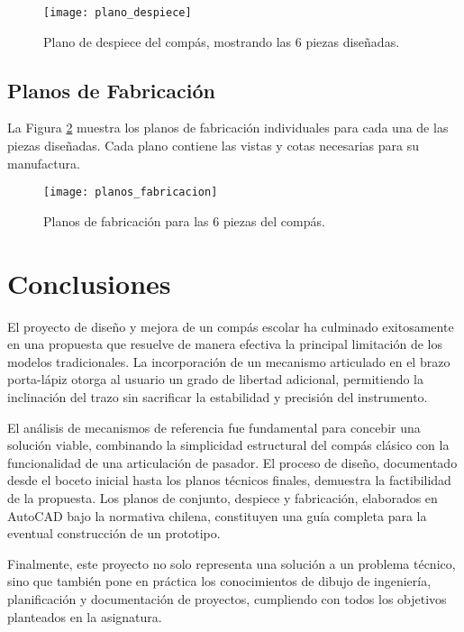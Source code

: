 \documentclass[11pt, a4paper]{article}
\begin{document}
\begin{figure}[H]
    \centering
    \texttt{[image: plano\_despiece]}
    \caption{Plano de despiece del compás, mostrando las 6 piezas diseñadas.}
    \label{fig:despiece}
\end{figure}
\newpage

\subsection{Planos de Fabricación}
La Figura \ref{fig:fabricacion} muestra los planos de fabricación individuales para cada una de las piezas diseñadas. Cada plano contiene las vistas y cotas necesarias para su manufactura.

\begin{figure}[H]
    \centering
    \texttt{[image: planos\_fabricacion]}
    \caption{Planos de fabricación para las 6 piezas del compás.}
    \label{fig:fabricacion}
\end{figure}

\newpage
\section{Conclusiones}
El proyecto de diseño y mejora de un compás escolar ha culminado exitosamente en una propuesta que resuelve de manera efectiva la principal limitación de los modelos tradicionales. La incorporación de un mecanismo articulado en el brazo porta-lápiz otorga al usuario un grado de libertad adicional, permitiendo la inclinación del trazo sin sacrificar la estabilidad y precisión del instrumento.

El análisis de mecanismos de referencia fue fundamental para concebir una solución viable, combinando la simplicidad estructural del compás clásico con la funcionalidad de una articulación de pasador. El proceso de diseño, documentado desde el boceto inicial hasta los planos técnicos finales, demuestra la factibilidad de la propuesta. Los planos de conjunto, despiece y fabricación, elaborados en AutoCAD bajo la normativa chilena, constituyen una guía completa para la eventual construcción de un prototipo.

Finalmente, este proyecto no solo representa una solución a un problema técnico, sino que también pone en práctica los conocimientos de dibujo de ingeniería, planificación y documentación de proyectos, cumpliendo con todos los objetivos planteados en la asignatura.

\printbibliography[title={Bibliografía}]
\end{document}
